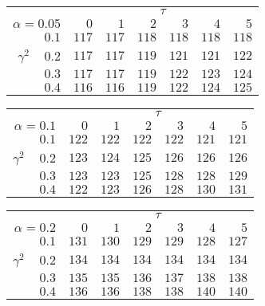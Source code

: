 \begin{tabular}{r|rrrrrr}
\hline\hline
 &\multicolumn{6}{c}{$\tau$} \\ 
 $\alpha = 0.05$ & $0$ & $1$ & $2$ & $3$ & $4$ & $5$ \\ 
 \hline$0.1$ & $117$ & $117$ & $118$ & $118$ & $118$ & $118$\\ 
$\gamma^2\;\;\;$ $0.2$ & $117$ & $117$ & $119$ & $121$ & $121$ & $122$\\ 
$0.3$ & $117$ & $117$ & $119$ & $122$ & $123$ & $124$\\ 
$0.4$ & $116$ & $116$ & $119$ & $122$ & $124$ & $125$\\ 
 \hline 
 \end{tabular}
 
 \vspace{2em} 
 
\begin{tabular}{r|rrrrrr}
\hline\hline
 &\multicolumn{6}{c}{$\tau$} \\ 
 $\alpha = 0.1$ & $0$ & $1$ & $2$ & $3$ & $4$ & $5$ \\ 
 \hline$0.1$ & $122$ & $122$ & $122$ & $122$ & $121$ & $121$\\ 
$\gamma^2\;\;\;$ $0.2$ & $123$ & $124$ & $125$ & $126$ & $126$ & $126$\\ 
$0.3$ & $123$ & $123$ & $125$ & $128$ & $128$ & $129$\\ 
$0.4$ & $122$ & $123$ & $126$ & $128$ & $130$ & $131$\\ 
 \hline 
 \end{tabular}
 
 \vspace{2em} 
 
\begin{tabular}{r|rrrrrr}
\hline\hline
 &\multicolumn{6}{c}{$\tau$} \\ 
 $\alpha = 0.2$ & $0$ & $1$ & $2$ & $3$ & $4$ & $5$ \\ 
 \hline$0.1$ & $131$ & $130$ & $129$ & $129$ & $128$ & $127$\\ 
$\gamma^2\;\;\;$ $0.2$ & $134$ & $134$ & $134$ & $134$ & $134$ & $134$\\ 
$0.3$ & $135$ & $135$ & $136$ & $137$ & $138$ & $138$\\ 
$0.4$ & $136$ & $136$ & $138$ & $138$ & $140$ & $140$\\ 
 \hline 
 \end{tabular}
